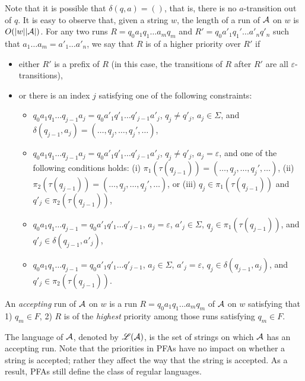 {Note that it is possible that $\delta(q, a) = ()$, that is, there is no $a$-transition out of $q$. 
It is easy to observe that, given a string $w$, the length of a run of $\mathcal{A}$ on $w$ is $O(|w||\mathcal{A}|)$. 
For any two runs $R = q_0 a_1 q_1 \ldots a_m q_m$ and $R' =  q_0 a'_1 q_1' \ldots a'_n q'_n$ such that $a_1 \ldots a_m = a'_1 \ldots a'_n$, we say that $R$ is of a higher priority over $R'$ if 
\begin{itemize}
	\item either $R'$ is a prefix of $R$ (in this case, the transitions of $R$ after $R'$ are all $\varepsilon$-transitions), 
	\item or there is an index $j$ satisfying one of the following constraints:
	\begin{itemize}
		\item $q_0 a_1 q_1 \ldots q_{j-1} a_j = q_0 a'_1 q'_1 \ldots q'_{j-1} a'_j$, $q_j \neq q'_j$, $a_j \in \Sigma$, and $\delta (q_{j - 1}, a_j) =(\ldots, q_j, \ldots, q_j', \ldots)$,
		\item $q_0 a_1 q_1 \ldots q_{j-1} a_j = q_0 a'_1 q'_1 \ldots q'_{j-1} a'_j$, $q_j \neq q'_j$, $a_j  = \varepsilon$,  and one of the following conditions holds: (i) $\pi_1(\tau(q_{j - 1})) = (\ldots, q_j, \ldots, q_j', \ldots)$, (ii) $\pi_2(\tau(q_{j - 1})) = (\ldots, q_j, \ldots, q_j', \ldots)$, or (iii) $q_j \in \pi_1(\tau(q_{j - 1}))$ and $q'_j \in \pi_2(\tau(q_{j-1}))$, 
		\item $q_0 a_1 q_1 \ldots q_{j-1}  = q_0 a'_1 q'_1 \ldots q'_{j-1} $, $a_j  = \varepsilon$, $a'_j  \in \Sigma$, $q_j \in \pi_1(\tau(q_{j - 1}))$, and $q'_j \in \delta(q_{j-1}, a'_j)$, 
		\item $q_0 a_1 q_1 \ldots q_{j-1}  = q_0 a'_1 q'_1 \ldots q'_{j-1} $, $a_j  \in \Sigma$, $a'_j  = \varepsilon$, $q_j \in \delta(q_{j - 1}, a_j)$, and $q'_j \in \pi_2(\tau(q_{j-1}))$.
	\end{itemize}
\end{itemize}
An \emph{accepting} run of $\mathcal{A}$ on $w$ is a run $R = q_0 a_1 q_1 \ldots a_m q_m$ of $\mathcal{A}$ on $w$ satisfying that 1) $q_m \in F$, 2) $R$ is of the \emph{highest} priority among those runs satisfying $q_m \in F$. 

The language of $\mathcal{A}$, denoted by $\mathscr{L}(\mathcal{A})$, is the set of strings on which $\mathcal{A}$ has an accepting run.
%
Note that the priorities in PFAs have no impact on whether a string is accepted; rather they affect the way that the string is accepted. As a result, PFAs still define the class of regular languages. 
}



